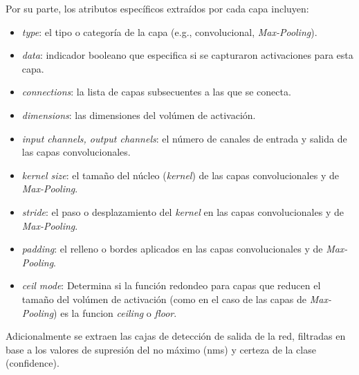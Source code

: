 Por su parte, los atributos específicos extraídos por cada capa incluyen:
\begin{itemize}
    \item \textit{type}: el tipo o categoría de la capa (e.g., convolucional, \textit{Max-Pooling}).
    \item \textit{data}: indicador booleano que especifica si se capturaron activaciones para esta capa.
    \item \textit{connections}: la lista de capas subsecuentes a las que se conecta.
    \item \textit{dimensions}: las dimensiones del volúmen de activación.
    \item \textit{input channels, output channels}: el número de canales de entrada y salida de las 
    capas convolucionales.
    \item \textit{kernel size}: el tamaño del núcleo (\textit{kernel}) de las capas convolucionales 
    y de \textit{Max-Pooling}.
    \item \textit{stride}: el paso o desplazamiento del \textit{kernel} en las capas convolucionales
     y de \textit{Max-Pooling}.
    \item \textit{padding}: el relleno o bordes aplicados en las capas convolucionales y de 
    \textit{Max-Pooling}.
    \item \textit{ceil mode}: Determina si la función redondeo para capas que reducen el tamaño del
    volúmen de activación (como en el caso de las capas de \textit{Max-Pooling}) es la funcion \textit{ceiling} o \textit{floor}.
\end{itemize}

Adicionalmente se extraen las cajas de detección de salida de la red, filtradas en base a los valores de
supresión del no máximo (nms) y certeza de la clase (confidence).